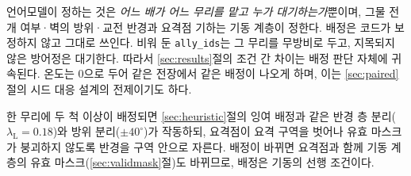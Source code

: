 언어모델이 정하는 것은 \emph{어느 배가 어느 무리를 맡고 누가 대기하는가}뿐이며, 그물
전개 여부·벽의 방위·교전 반경과 요격점 기하는 기동 계층이 정한다. 배정은 코드가 보정하지
않고 그대로 쓰인다. 비워 둔 \texttt{ally\_ids}는 그 무리를 무방비로 두고, 지목되지 않은
방어정은 대기한다. 따라서 \ref{sec:results}절의 조건 간 차이는 배정 판단 자체에 귀속된다.
온도는 0으로 두어 같은 전장에서 같은 배정이 나오게 하며, 이는 \ref{sec:paired}절의 시드
대응 설계의 전제이기도 하다.

한 무리에 두 척 이상이 배정되면 \ref{sec:heuristic}절의 잉여 배정과 같은 반경 층
분리($\lambda_{\mathrm{L}} = 0.18$)와 방위 분리($\pm 40^\circ$)가 작동하되, 요격점이 요격
구역을 벗어나 유효 마스크가 붕괴하지 않도록 반경을 구역 안으로 자른다. 배정이 바뀌면
요격점과 함께 기동 계층의 유효 마스크(\ref{sec:validmask}절)도 바뀌므로, 배정은 기동의
선행 조건이다.
